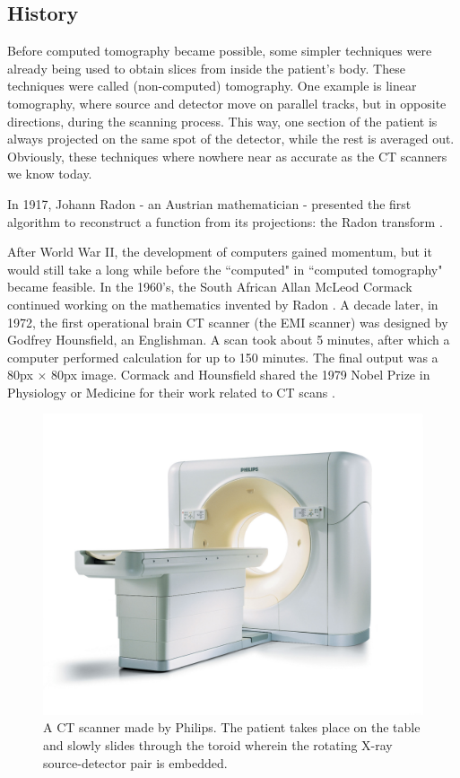 \subsection{History}
Before computed tomography became possible, some simpler techniques were already
being used to obtain slices from inside the patient's body. These techniques
were called (non-computed) tomography. One example is linear tomography,
where source and detector move on parallel tracks, but in opposite directions,
during the scanning process. This way, one section of the patient is always
projected on the same spot of the detector, while the rest is averaged out.
Obviously, these techniques where nowhere near as accurate as the CT scanners we
know today.

In 1917, Johann Radon - an Austrian mathematician - presented the first
algorithm to reconstruct a function from its projections: the Radon transform
\cite{radon}.

After World War II, the development of computers gained momentum, but it would
still take a long while before the ``computed" in ``computed tomography" became
feasible. In the 1960's, the South African Allan McLeod Cormack continued
working on the mathematics invented by Radon \cite{ctreview}. A decade later, in
1972, the first operational brain CT scanner (the EMI scanner) was designed by
Godfrey Hounsfield, an Englishman. A scan took about 5 minutes, after which a
computer performed calculation for up to 150 minutes. The final output was a
80px $\times$ 80px image. Cormack and Hounsfield shared the 1979 Nobel Prize in
Physiology or Medicine for their work related to CT scans \cite{ctbook}.

\begin{figure}[ht]
\begin{center}
  \includegraphics[width=\linewidth]{img/ctscanner.jpg}
  \caption{A CT scanner made by Philips. The patient takes place on the table
  and slowly slides through the toroid wherein the rotating X-ray
  source-detector pair is embedded.}
  \label{fig:ctscanner}
\end{center}
\end{figure}


